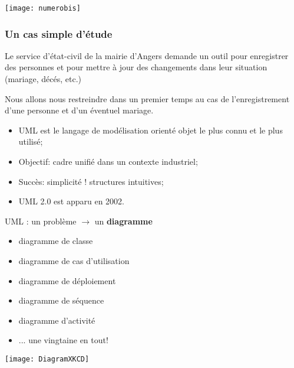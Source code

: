\documentclass[french]{beamer}
\begin{document}
\begin{frame}
  
\begin{center}
  \texttt{[image: numerobis]}
\end{center}

\end{frame}


\begin{frame}\frametitle{Un cas simple d'étude}
Le service d'état-civil de la mairie  d'Angers demande un outil pour enregistrer
des  personnes  et pour  mettre  à  jour  des  changements dans  leur  situation
(mariage, décés, etc.)

\pause

Nous allons  nous restreindre dans un  premier temps au cas  de l'enregistrement
d'une personne et d'un éventuel mariage.
\end{frame}




\begin{frame}
  \begin{itemize}
  \item UML  est le langage  de modélisation orienté objet  le plus connu  et le
    plus utilisé;
  \item Objectif: cadre unifié dans un contexte industriel;
    \item Succès: simplicité ! structures intuitives;
    \item UML 2.0 est apparu en 2002.
     
  \end{itemize}
\end{frame}

\begin{frame}
  UML : un problème $\longrightarrow$ un \textbf{diagramme}
  \begin{itemize}
  \item diagramme de classe
  \item diagramme de cas d'utilisation
  \item diagramme de déploiement
  \item diagramme de séquence
  \item diagramme d'activité
    \item ... une vingtaine en tout!
  \end{itemize}
\end{frame}


\begin{frame}
  
\begin{center}
  \texttt{[image: DiagramXKCD]}
\end{center}

\end{frame}
\end{document}
